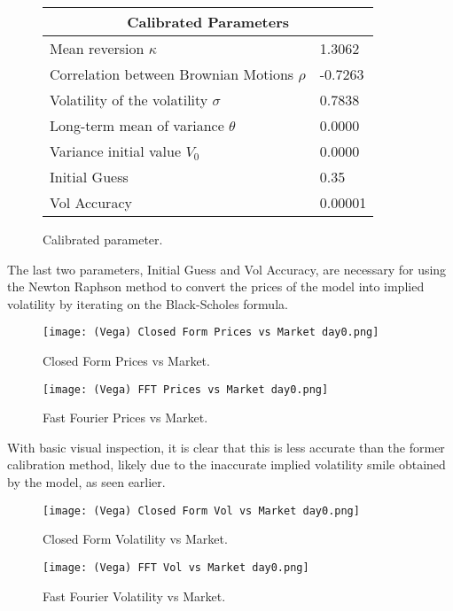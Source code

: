\documentclass[fontsize=12pt]{article}
\numberwithin{equation}{section} %
\numberwithin{figure}{section} %
\numberwithin{table}{section} %
\begin{document}
\begin{figure}[H]
\centering
\begin{tabular}{| p{6.5cm}| p{2.0cm} |}
\hline
\multicolumn{2}{|c|}{Calibrated Parameters} \\
\hline
Mean reversion $\kappa$ & 1.3062 \\ \hline
Correlation between Brownian Motions $\rho$ & -0.7263 \\ \hline
Volatility of the volatility $\sigma$ & 0.7838\\ \hline
Long-term mean of variance $\theta$ & 0.0000 \\ \hline
Variance initial value $V_0$ & 0.0000 \\ \hline
Initial Guess & 0.35 \\ \hline
Vol Accuracy & 0.00001 \\ \hline
\end{tabular}
\caption{Calibrated parameter.}
\label{tabla:Calibrated Parameters FFT}
\end{figure}

The last two parameters, Initial Guess and Vol Accuracy, are necessary for using the Newton Raphson method to convert the prices of the model into implied volatility by iterating on the Black-Scholes formula.

\begin{figure}[H]
  \centering
   \texttt{[image: (Vega) Closed Form Prices vs Market day0.png]}
  \caption{Closed Form Prices vs Market.}
  \label{fig:CF Prices}
\end{figure}

\begin{figure}[H]
  \centering
   \texttt{[image: (Vega) FFT Prices vs Market day0.png]}
  \caption{Fast Fourier Prices vs Market.}
  \label{fig:CF Prices}
\end{figure}

With basic visual inspection, it is clear that this is less accurate than the former calibration method, likely due to the inaccurate implied volatility smile obtained by the model, as seen earlier.

\begin{figure}[H]
  \centering
   \texttt{[image: (Vega) Closed Form Vol vs Market day0.png]}
  \caption{Closed Form Volatility vs Market.}
  \label{fig:CF Vol}
\end{figure}

\begin{figure}[H]
  \centering
   \texttt{[image: (Vega) FFT Vol vs Market day0.png]}
  \caption{Fast Fourier Volatility vs Market.}
  \label{fig:FFT Vol}
\end{figure}
\end{document}
